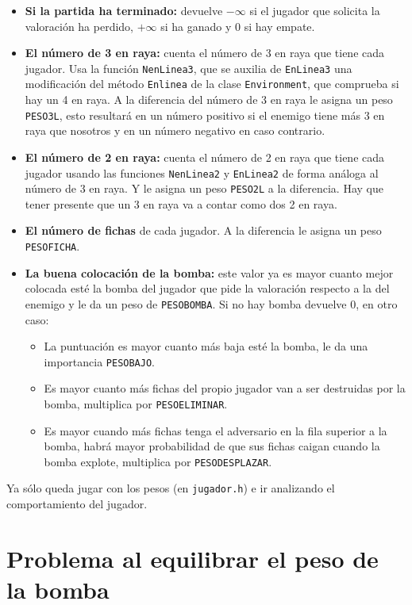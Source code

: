 \documentclass{article}
\begin{document}
\begin{itemize}
\item \textbf{Si la partida ha terminado:} devuelve $-\infty$ si el
  jugador que solicita la valoración ha perdido, $+\infty$ si ha
  ganado y 0 si hay empate.

\item \textbf{El número de 3 en raya:} cuenta el número de 3 en raya
  que tiene cada jugador. Usa la función \texttt{NenLinea3}, que se
  auxilia de \texttt{EnLinea3} una modificación del método
  \texttt{Enlinea} de la clase \texttt{Environment}, que comprueba si
  hay un 4 en raya. A la diferencia del número de 3 en raya le asigna
  un peso \texttt{PESO3L}, esto resultará en un número positivo si
  el enemigo tiene más 3 en raya que nosotros y en un número negativo
  en caso contrario.

\item \textbf{El número de 2 en raya:} cuenta el número de 2 en raya
  que tiene cada jugador usando las funciones \texttt{NenLinea2} y
  \texttt{EnLinea2} de forma análoga al número de 3 en raya. Y le
  asigna un peso \texttt{PESO2L} a la diferencia. Hay que tener
  presente que un 3 en raya va a contar como dos 2 en raya.

\item \textbf{El número de fichas} de cada jugador. A la diferencia le
  asigna un peso \texttt{PESOFICHA}.

\item \textbf{La buena colocación de la bomba:} este valor ya es mayor
  cuanto mejor colocada esté la bomba del jugador que pide la
  valoración respecto a la del enemigo y le da un peso de
  \texttt{PESOBOMBA}. Si no hay bomba devuelve 0, en otro caso:
  \begin{itemize}
  \item La puntuación es mayor cuanto más baja esté la bomba, le da
    una importancia \texttt{PESOBAJO}.
  \item Es mayor cuanto más fichas del propio jugador van a ser
    destruidas por la bomba, multiplica por \texttt{PESOELIMINAR}.
  \item Es mayor cuando más fichas tenga el adversario en la fila
    superior a la bomba, habrá mayor probabilidad de que sus fichas
    caigan cuando la bomba explote, multiplica por
    \texttt{PESODESPLAZAR}.
  \end{itemize}
\end{itemize}

Ya sólo queda jugar con los pesos (en \texttt{jugador.h}) e ir
analizando el comportamiento del jugador.

\section{Problema al equilibrar el peso de la bomba}
\end{document}
